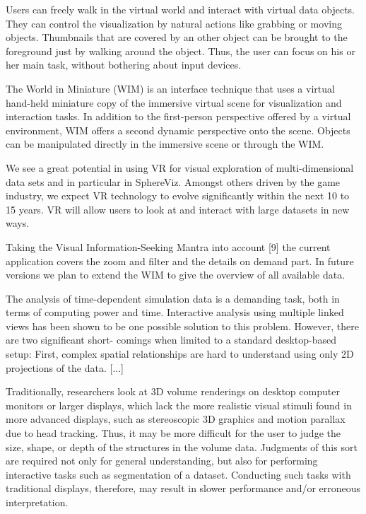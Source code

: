 Users can freely walk in the virtual world and interact with virtual data objects. They can control the visualization by natural actions like grabbing or moving objects. Thumbnails that are covered by an other object can be brought
to the foreground just by walking around the object. Thus, the user can focus on his or her main task, without bothering about input devices.
\cite{Soldati2007}

The World in Miniature (WIM) is an interface technique that uses a virtual hand-held miniature copy of the immersive virtual scene for visualization and interaction tasks. In addition to the first-person perspective offered by a virtual environment, WIM offers a second dynamic perspective onto the scene. Objects can be manipulated directly in the immersive scene or through the WIM.
\cite{Soldati2007}

We see a great potential in using VR for visual exploration of multi-dimensional data sets and in particular in SphereViz. Amongst others driven by the game industry, we expect VR technology to evolve significantly within the next 10 to 15 years. VR will allow users to look at and interact with large datasets in new ways.
\cite{Soldati2007}

Taking the Visual Information-Seeking Mantra into account [9] the current application covers the zoom and filter and the details on demand part. In future versions we plan to extend the WIM to give the overview of all available data.
\cite{Soldati2007}

The analysis of time-dependent simulation data is a demanding task, both in terms of computing power and time. Interactive analysis using multiple linked views has been shown to be one possible solution to this problem. However, there are two significant short- comings when limited to a standard desktop-based setup: First, complex spatial relationships are hard to understand using only 2D projections of the data. [...]
\cite{Hentschel2009}

Traditionally, researchers look at 3D volume renderings on desktop computer monitors or larger displays, which lack the more realistic visual stimuli found in more advanced displays, such as stereoscopic 3D graphics and motion parallax due to head tracking. Thus, it may be more difficult for the user to judge the size, shape, or depth of the structures in the volume data. Judgments of this sort are required not only for general understanding, but also for performing interactive tasks such as segmentation of a dataset. Conducting such tasks with traditional displays, therefore, may result in slower performance and/or erroneous interpretation.
\cite{Laha2012}

